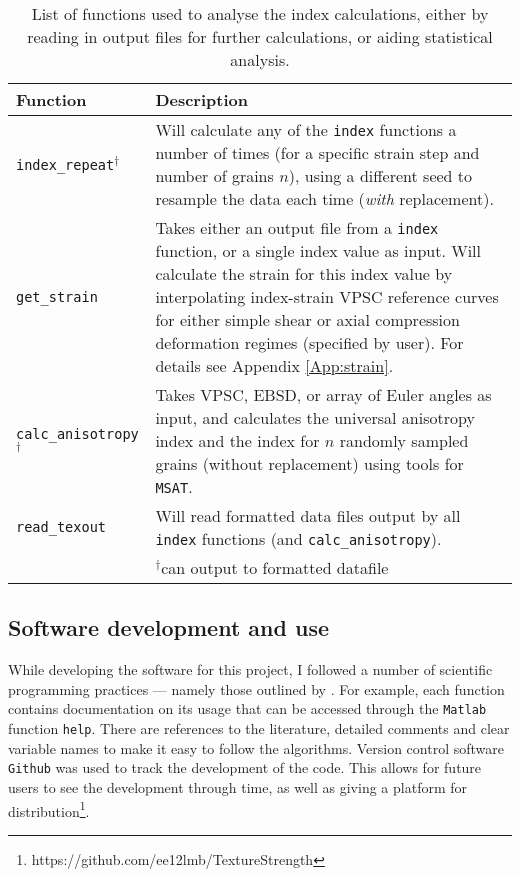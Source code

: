 \documentclass[a4paper,12pt,twoside]{report}
\numberwithin{equation}{chapter}
\begin{document}
\begin{table}[h!] 
	\centering
	\caption[Functions: analysis]{List of functions used to analyse the index calculations, either by reading in output files for further calculations, or aiding statistical analysis.}
	\noindent
	
\begin{tabularx}{\textwidth}{lX}

\hline
\hline
Function    & Description   \\ 
\hline
\hline
\texttt{index\_{}repeat}$^{\dagger}$ & Will calculate any of the \texttt{index} functions a number of times (for a specific strain step and number of grains $n$), using a different seed to resample the data each time (\emph{with} replacement). \\

\texttt{get\_{}strain} & Takes either an output file from a \texttt{index} function, or a single index value as input. Will calculate the strain for this index value by interpolating index-strain VPSC reference curves for either simple shear or axial compression deformation regimes (specified by user). For details see Appendix \ref{App:strain}. \\

\texttt{calc\_{}anisotropy}$^\dagger$ & Takes VPSC, EBSD, or array of Euler angles as input, and calculates the universal anisotropy index and the \cite{Ledbetter2006} index for $n$ randomly sampled grains (without replacement) using tools for \texttt{MSAT}. \\

\texttt{read\_{}texout} & Will read formatted data files output by all \texttt{index} functions (and \texttt{calc\_{}anisotropy}). \\
\hline
{} & $^\dagger$can output to formatted datafile \\
\hline
\hline
\end{tabularx}
\label{tab:analysis_functions}
\end{table}

\subsection{Software development and use}

While developing the software for this project, I followed a number of scientific programming practices --- namely those outlined by \cite{Wilson2014}. For example, each function contains documentation on its usage that can be accessed through the \texttt{Matlab} function \texttt{help}. There are references to the literature, detailed comments and clear variable names to make it easy to follow the algorithms. Version control software \texttt{Github} was used to track the development of the code. This allows for future users to see the development through time, as well as giving a platform for distribution\footnote{https://github.com/ee12lmb/TextureStrength}.
\end{document}
